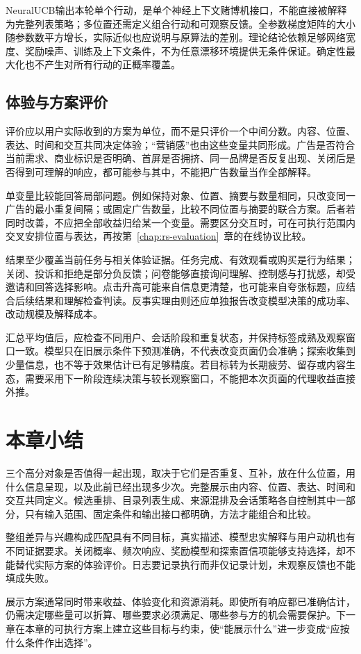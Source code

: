 NeuralUCB输出本轮单个行动，是单个神经上下文赌博机接口，不能直接被解释为完整列表策略；多位置还需定义组合行动和可观察反馈。全参数梯度矩阵的大小随参数数平方增长，实际近似也应说明与原算法的差别。理论结论依赖足够网络宽度、奖励噪声、训练及上下文条件，不为任意漂移环境提供无条件保证。确定性最大化也不产生对所有行动的正概率覆盖。

\subsection{体验与方案评价}
\label{sec:rs-display-experience}

评价应以用户实际收到的方案为单位，而不是只评价一个中间分数。内容、位置、表达、时间和交互共同决定体验；“营销感”也由这些变量共同形成。广告是否符合当前需求、商业标识是否明确、首屏是否拥挤、同一品牌是否反复出现、关闭后是否得到可理解的响应，都可能参与其中，不能把广告数量当作全部解释。

单变量比较能回答局部问题。例如保持对象、位置、摘要与数量相同，只改变同一广告的最小重复间隔；或固定广告数量，比较不同位置与摘要的联合方案。后者若同时改善，不应把全部收益归给某一个变量。需要区分交互时，可在可执行范围内交叉安排位置与表达，再按第~\ref{chap:rs-evaluation}~章的在线协议比较。

结果至少覆盖当前任务与相关体验证据。任务完成、有效观看或购买是行为结果；关闭、投诉和拒绝是部分负反馈；问卷能够直接询问理解、控制感与打扰感，却受邀请和回答选择影响。点击升高可能来自信息更清楚，也可能来自夸张标题，应结合后续结果和理解检查判读。反事实理由则还应单独报告改变模型决策的成功率、改动规模及解释成本。

汇总平均值后，应检查不同用户、会话阶段和重复状态，并保持标签成熟及观察窗口一致。模型只在旧展示条件下预测准确，不代表改变页面仍会准确；探索收集到少量信息，也不等于效果估计已有足够精度。若目标转为长期疲劳、留存或内容生态，需要采用下一阶段连续决策与较长观察窗口，不能把本次页面的代理收益直接外推。

\section{本章小结}
\label{sec:rs-presentation-summary}

三个高分对象是否值得一起出现，取决于它们是否重复、互补，放在什么位置，用什么信息呈现，以及此前已经出现多少次。完整展示由内容、位置、表达、时间和交互共同定义。候选重排、目录列表生成、来源混排及会话策略各自控制其中一部分，只有输入范围、固定条件和输出接口都明确，方法才能组合和比较。

整组差异与兴趣构成匹配具有不同目标，真实描述、模型忠实解释与用户动机也有不同证据要求。关闭概率、频次响应、奖励模型和探索置信项能够支持选择，却不能替代实际方案的体验评价。日志要记录执行而非仅记录计划，未观察反馈也不能填成失败。

展示方案通常同时带来收益、体验变化和资源消耗。即使所有响应都已准确估计，仍需决定哪些量可以折算、哪些要求必须满足、哪些参与方的机会需要保护。下一章在本章的可执行方案上建立这些目标与约束，使“能展示什么”进一步变成“应按什么条件作出选择”。
